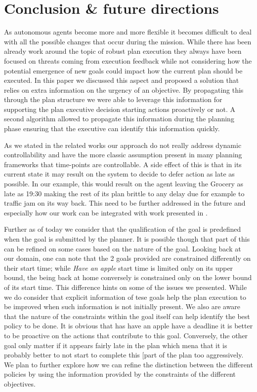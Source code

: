 \section{Conclusion \& future directions}
\label{sec:conclude}

As autonomous agents become more and more flexible it becomes difficult
to deal with all the possible changes that occur during the
mission. While there has been already work around the topic of robust
plan execution they always have been focused on threats coming from
execution feedback while not considering how the potential emergence of
new goals could impact how the current plan should be executed. In this
paper we discussed this aspect and proposed a solution that relies on
extra information on the urgency of an objective. By propagating this
through the plan structure we were able to leverage this information for
supporting the plan executive decision starting actions proactively or
not. A second algorithm allowed to propagate this information during the
planning phase ensuring that the executive can identify this information
quickly.

 As we stated in the related works our approach do not
really address dynamic controllability and have the more classic
assumption present in many planning frameworks that time-points are
controllable. A side effect of this is that in its current state it may
result on the system to decide to defer action as late as possible. In
our example, this would result on the agent leaving the Grocery as late
as 19:30 making the rest of its plan brittle to any delay due for
example to traffic jam on its way back. This need to be further
addressed in the future and especially how our work can be integrated
with work presented in \cite{morris01}.

Further as of today we consider that the qualification of the goal is
predefined when the goal is submitted by the planner. It is possible
though that part of this can be refined on some cases based on the
nature of the goal. Looking back at our domain, one can note that the 2
goals provided are constrained differently on their start time; while
{\em Have an apple} start time is limited only on its upper bound, the
being back at home conversely is constrained only on the lower bound of
its start time. This difference hints on some of the issues we
presented. While we do consider that explicit information of tese goals
help the plan execution to be improved when such information is not
initially present. We also are aware that the nature of the constraints
within the goal itself can help identify the best policy to be done. It
is obvious that has have an apple have a deadline it is better to be
proactive on the actions that contribute to this goal. Conversely, the
other goal only matter if it appears fairly late in the plan which mena
that it is probably better to not start to complete this [part of the
plan too aggressively. We plan to further explore how we can refine the
distinction between the different policies by using the information
provided by the constraints of the different objectives.
 
